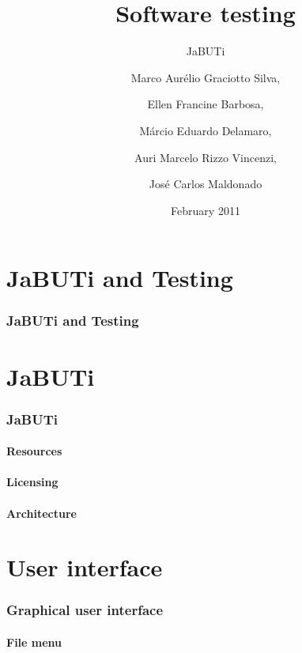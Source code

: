 \documentclass[utf8, english, usepdftitle=false, svgnames, color="table, fixpdftex,  fixinclude, xcdraw", t]{beamer}
\title{Software testing}
\subtitle{JaBUTi}
\author[]{%
Marco Aurélio Graciotto Silva\inst{1}, \and
Ellen Francine Barbosa\inst{1}, \\\and
Márcio Eduardo Delamaro\inst{1}, \and
Auri Marcelo Rizzo Vincenzi\inst{2}, \\\and
José Carlos Maldonado\inst{1}}
\institute[ICMC]
{
	\inst{1}%
	University of São Paulo (USP)\\
	São Carlos, SP, Brazil
	\and
	\inst{2}%
	Federal University of Goiás (UFG)\\
	Goiânia, GO, Brazil
}
\date[]{February 2011}
\begin{document}
\frontmatter{}


\mainmatter{}

%
\part{JaBUTi and Testing}
\section{JaBUTi and Testing}



%
\part{JaBUTi}
\section{JaBUTi}


\subsection{Resources}


\subsection{Licensing}


\subsection{Architecture}




%
\part{User interface}
\section{Graphical user interface}


\subsection{File menu}

\end{document}
